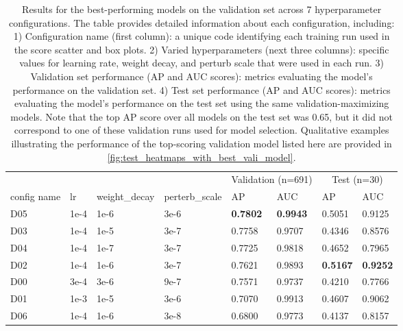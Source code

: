 \begin{table*}[t]
\caption{
Results for the best-performing models on the validation set across 7 hyperparameter configurations.
The table provides detailed information about each configuration, including:
1) Configuration name (first column): a unique code identifying each training run used in the score scatter and box plots.
2) Varied hyperparameters (next three columns): specific values for learning rate, weight decay, and perturb scale that were used in each run.
3) Validation set performance (AP and AUC scores): metrics evaluating the model's performance on the validation set.
4) Test set performance (AP and AUC scores): metrics evaluating the model's performance on the test set using the same validation-maximizing models.
Note that the top AP score over all models on the test set was 0.65, but it did not correspond to one of these validation runs used for model selection.
Qualitative examples illustrating the performance of the top-scoring validation model listed here are provided in \cref{fig:test_heatmaps_with_best_vali_model}.
}
\label{tab:parameters_and_results}
\centering
\begin{tabular}{llllllll}
\toprule
            \multicolumn{4}{l}{} & \multicolumn{2}{c}{Validation (n=691)} & \multicolumn{2}{c}{Test (n=30)} \\
config name &   lr & weight\_decay & perterb\_scale & AP & AUC & AP & AUC \\
\midrule
        \textcolor[HTML]{623682}{D05} & 1e-4 &   1e-6 &  3e-6 & \textbf{0.7802} & \textbf{0.9943} &          0.5051 &          0.9125 \\
        \textcolor[HTML]{df8020}{D03} & 1e-4 &   1e-5 &  3e-7 &          0.7758 &          0.9707 &          0.4346 &          0.8576 \\
        \textcolor[HTML]{87b787}{D04} & 1e-4 &   1e-7 &  3e-7 &          0.7725 &          0.9818 &          0.4652 &          0.7965 \\
        \textcolor[HTML]{207fdf}{D02} & 1e-4 &   1e-6 &  3e-7 &          0.7621 &          0.9893 & \textbf{0.5167} & \textbf{0.9252} \\
        \textcolor[HTML]{20df20}{D00} & 3e-4 &   3e-6 &  9e-7 &          0.7571 &          0.9737 &          0.4210 &          0.7766 \\
        \textcolor[HTML]{df20df}{D01} & 1e-3 &   1e-5 &  3e-6 &          0.7070 &          0.9913 &          0.4607 &          0.9062 \\
        \textcolor[HTML]{b00403}{D06} & 1e-4 &   1e-6 &  3e-8 &          0.6800 &          0.9773 &          0.4137 &          0.8157 \\
        
\bottomrule
\end{tabular}
\end{table*}

